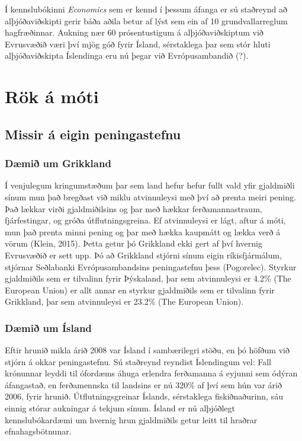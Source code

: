 \documentclass[a4paper]{article}
\begin{document}
Í kennslubókinni \textit{Economics} sem er kennd í þessum áfanga er sú staðreynd að alþjóðaviðskipti gerir báða aðila betur af lýst sem ein af 10 grundvallarreglum hagfræðinnar. Aukning nær 60 prósentustigum á alþjóðaviðskiptum við Evrusvæðið væri því mjög góð fyrir Ísland, sérstaklega þar sem stór hluti alþjóðaviðskipta Íslendinga eru nú þegar við Evrópusambandið (?).

\section{Rök á móti}

\subsection{Missir á eigin peningastefnu}

\subsubsection{Dæmið um Grikkland}

Í venjulegum kringumstæðum þar sem land hefur hefur fullt vald yfir gjaldmiðli sínum mun það bregðast við miklu atvinnuleysi með því að prenta meiri pening. Það lækkar virði gjaldmiðilsins og þar með hækkar ferðamannastraum, fjárfestingar, og gróða útflutningsgreina. Ef atvinnuleysi er lágt, aftur á móti, mun það prenta minni pening og þar með hækka kaupmátt og lækka verð á vörum (Klein, 2015). Þetta getur þó Grikkland ekki gert af því hvernig Evrusvæðið er sett upp. Þó að Grikkland stjórni sínum eigin ríkisfjármálum, stjórnar Seðlabanki Evrópusambandsins  peningastefnu þess (Pogorelec). Styrkur gjaldmiðils sem er tilvalinn fyrir Þýskaland, þar sem atvinnuleysi er 4.2\% (The European Union) er allt annar en styrkur gjaldmiðils sem er tilvalinn fyrir Grikkland, þar sem atvinnuleysi er 23.2\% (The European Union).

\subsubsection{Dæmið um Ísland}

Eftir hrunið mikla árið 2008 var Ísland í sambærilegri stöðu, en þó höfðum við stjórn á okkar peningastefnu. Sú staðreynd reyndist Íslendingum vel: Fall krónunnar leyddi til ófordæms áhuga erlendra ferðamanna á eyjunni sem ódýran áfangastað,\cite{worldfinance_2015} en ferðamennska til landsins er nú 320\% af því sem hún var árið 2006, fyrir hrunið.\cite{hagstofan_passengers} Útflutningsgreinar Íslands, sérstaklega fiskiðnaðurinn, sáu einnig stórar aukningar á tekjum sínum. Ísland er nú alþjóðlegt kennslubókardæmi um hvernig hrun gjaldmiðils getur leitt til hraðrar efnahagsbötnunar.\cite{worldfinance_2015}
\end{document}
